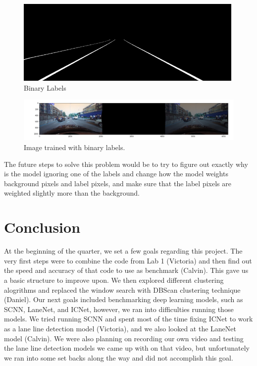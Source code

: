 \documentclass[twoside,twocolumn]{article}
\begin{document}
\begin{figure}
  \includegraphics[width=\linewidth]{9.png}
  \caption{Binary Labels}
  \label{fig:labels2}
\end{figure}

\begin{figure}
  \includegraphics[width=\linewidth]{8.png}
  \caption{Image trained with binary labels.}
  \label{fig:badbad}
\end{figure}

\par The future steps to solve this problem would be to try to figure out exactly why is the model ignoring one of the labels and change how the model weights background pixels and label pixels, and make sure that the label pixels are weighted slightly more than the background.


\section{Conclusion}
At the beginning of the quarter, we set a few goals regarding this project. The very first steps were to combine the code from Lab 1 (Victoria) and then find out the speed and accuracy of that code to use as benchmark (Calvin). This gave us a basic structure to improve upon. We then explored different clustering alogrithms and replaced the window search with DBScan clustering technique (Daniel). Our next goals included benchmarking deep learning models, such as SCNN, LaneNet, and ICNet, however, we ran into difficulties running those models. We tried running SCNN and spent most of the time fixing ICNet to work as a lane line detection model (Victoria), and we also looked at the LaneNet model (Calvin). We were also planning on recording our own video and testing the lane line detection models we came up with on that video, but unfortunately we ran into some set backs along the way and did not accomplish this goal.

\end{document}
